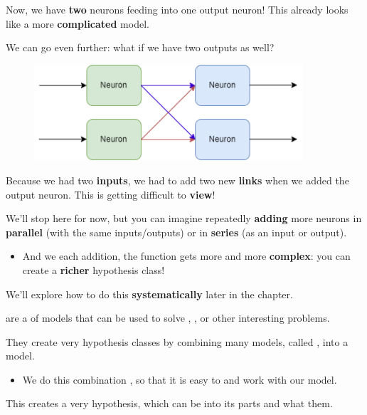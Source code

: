         Now, we have \textbf{two} neurons feeding into one output neuron! This already looks like a more \textbf{complicated} model. 
        
        We can go even further: what if we have two outputs as well?
        
        \begin{figure}[H]
        \centering
            \includegraphics[width=100mm,scale=0.4]{images/nn_images/four_neurons.png}
        \end{figure}
        
        Because we had two \textbf{inputs}, we had to add two new \textbf{links} when we added the output neuron. This is getting difficult to \textbf{view}!
        
        We'll stop here for now, but you can imagine repeatedly \textbf{adding} more neurons in \textbf{parallel} (with the same inputs/outputs) or in \textbf{series} (as an input or output).

        \begin{itemize}
            \item And we each addition, the function gets more and more \textbf{complex}: you can create a \textbf{richer} hypothesis class!
        \end{itemize}
        
        
        We'll explore how to do this \textbf{systematically} later in the chapter.
            \\
        
        \begin{definition}
             are a  of models that can be used to solve , , or other interesting problems.
            
            They create very  hypothesis classes by combining many  models, called , into a  model.

            \begin{itemize}
                \item We do this combination , so that it is easy to  and work with our model.
            \end{itemize}
            
            This creates a very  hypothesis, which can be  into its  parts and what  them.
        \end{definition}
        
